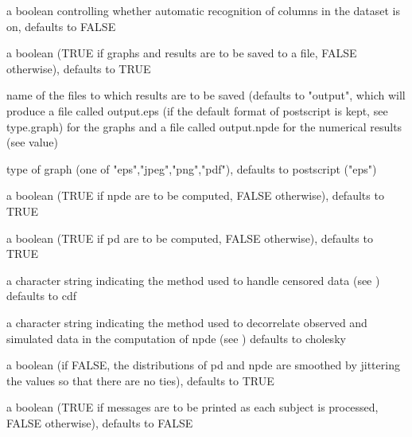 \documentclass[a4paper]{book}
\begin{document}
\begin{Arguments}
\begin{ldescription}
\item[\code{detect}] a boolean controlling whether automatic recognition of columns in
the dataset is on, defaults to FALSE

\item[\code{boolsave}] a boolean (TRUE if graphs and results are to be saved to a
file, FALSE otherwise), defaults to TRUE

\item[\code{namsav}] name of the files to which results are to be saved (defaults
to "output", which will produce a file called output.eps (if the default
format of postscript is kept, see type.graph) for the graphs and a file
called output.npde for the numerical results (see value)

\item[\code{type.graph}] type of graph (one of "eps","jpeg","png","pdf"), defaults
to postscript ("eps")

\item[\code{calc.npde}] a boolean (TRUE if npde are to be computed, FALSE otherwise),
defaults to TRUE

\item[\code{calc.pd}] a boolean (TRUE if pd are to be computed, FALSE otherwise), defaults
to TRUE

\item[\code{cens.method}] a character string indicating the method used to handle 
censored data (see )
defaults to cdf

\item[\code{decorr.method}] a character string indicating the method used to decorrelate
observed and simulated data in the computation of npde (see )
defaults to cholesky

\item[\code{ties}] a boolean (if FALSE, the distributions of pd and npde are smoothed by jittering the values so that there are no ties), defaults to TRUE

\item[\code{verbose}] a boolean (TRUE if messages are to be printed as each subject is
processed, FALSE otherwise), defaults to FALSE
\end{ldescription}
\end{Arguments}
%
\end{document}

